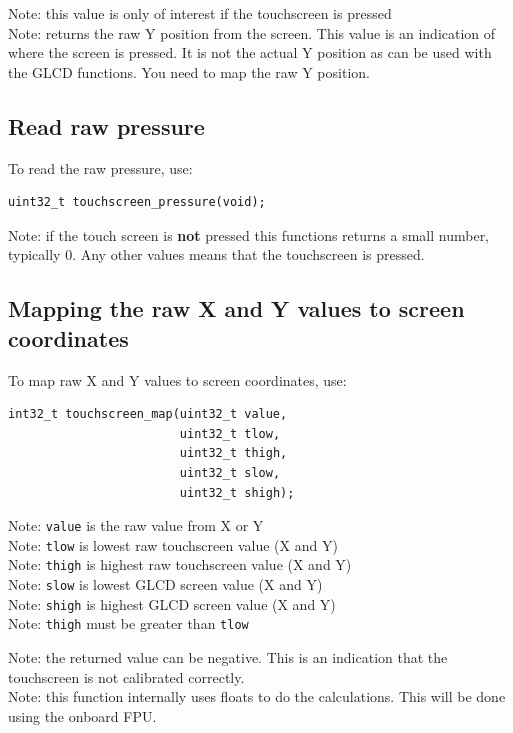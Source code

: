 \documentclass[12pt]{article}
\begin{document}
Note: this value is only of interest if the touchscreen is pressed\\Note: returns the raw Y position from the screen. This value is an indication of where the screen is pressed. It is not the actual Y position as can be used with the GLCD functions. You need to map the raw Y position.

\subsection{Read raw pressure}
To read the raw pressure, use:

\begin{lstlisting}
uint32_t touchscreen_pressure(void);
\end{lstlisting}

Note: if the touch screen is \textbf{not} pressed this functions returns a small number, typically 0. Any other values means that the touchscreen is pressed.

\subsection{Mapping the raw X and Y values to screen coordinates}
To map raw X and Y values to screen coordinates, use:

\begin{lstlisting}
int32_t touchscreen_map(uint32_t value,
                        uint32_t tlow,
                        uint32_t thigh,
                        uint32_t slow,
                        uint32_t shigh);
\end{lstlisting}

Note: \lstinline|value| is the raw value from X or Y\\
Note: \lstinline|tlow| is lowest raw touchscreen value (X and Y)\\
Note: \lstinline|thigh| is highest raw touchscreen value (X and Y)\\
Note: \lstinline|slow| is lowest GLCD screen value (X and Y)\\
Note: \lstinline|shigh| is highest GLCD screen value (X and Y)\\
Note: \lstinline|thigh| must be greater than \lstinline|tlow|

Note: the returned value can be negative. This is an indication that the touchscreen is not calibrated correctly.\\
Note: this function internally uses floats to do the calculations. This will be done using the onboard FPU.
\end{document}
